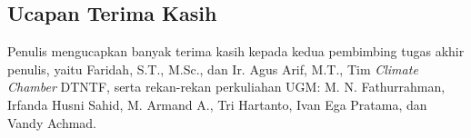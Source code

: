 \documentclass[a4paper,10pt]{article}
\newenvironment{body}{\begin{multicols}{2}}{\end{multicols}}
\begin{document}
\begin{body}
		\section*{Ucapan Terima Kasih}
		Penulis mengucapkan banyak terima kasih kepada kedua pembimbing tugas akhir penulis, yaitu Faridah, S.T., M.Sc., dan Ir. Agus Arif, M.T., Tim \textit{Climate Chamber} DTNTF, serta rekan-rekan perkuliahan UGM: M. N. Fathurrahman, Irfanda Husni Sahid, M. Armand A., Tri Hartanto, Ivan Ega Pratama, dan Vandy Achmad.
		
		
		
	\end{body}
\end{document}
